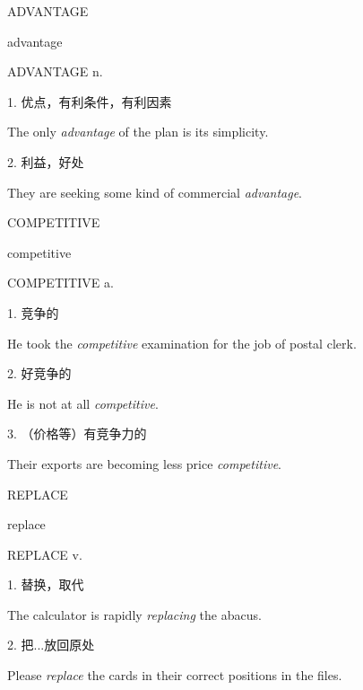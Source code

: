 \begin{flashcard}{
ADVANTAGE

advantage
}
\begin{center}
ADVANTAGE n. 
\end{center}
1. 优点，有利条件，有利因素

The only \textit{advantage} of the plan is its simplicity.

2. 利益，好处

They are seeking some kind of commercial \textit{advantage}.

\end{flashcard}
\begin{flashcard}{
COMPETITIVE

competitive
}
\begin{center}
COMPETITIVE a. 
\end{center}
1. 竞争的

He took the \textit{competitive} examination for the job of postal clerk.

2. 好竞争的

He is not at all \textit{competitive}.

3. （价格等）有竞争力的

Their exports are becoming less price \textit{competitive}.

\end{flashcard}
\begin{flashcard}{
REPLACE

replace
}
\begin{center}
REPLACE v. 
\end{center}
1. 替换，取代

The calculator is rapidly \textit{replacing} the abacus.

2. 把...放回原处

Please \textit{replace} the cards in their correct positions in the files.

\end{flashcard}
